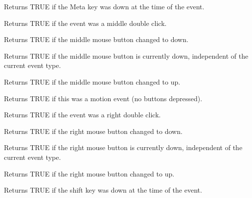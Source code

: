 Returns TRUE if the Meta key was down at the time of the event.



Returns TRUE if the event was a middle double click.



Returns TRUE if the middle mouse button changed to down.



Returns TRUE if the middle mouse button is currently down, independent
of the current event type.



Returns TRUE if the middle mouse button changed to up.



Returns TRUE if this was a motion event (no buttons depressed).



Returns TRUE if the event was a right double click.



Returns TRUE if the right mouse button changed to down.



Returns TRUE if the right mouse button is currently down, independent
of the current event type.



Returns TRUE if the right mouse button changed to up.



Returns TRUE if the shift key was down at the time of the event.

